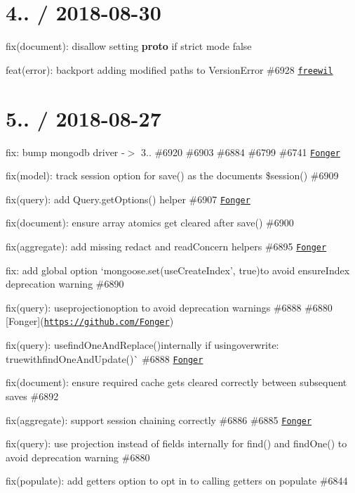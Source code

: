 \section*{4.. / 2018-\/08-\/30 }


\begin{DoxyItemize}
\item fix(document)\+: disallow setting {\bfseries proto} if strict mode false
\item feat(error)\+: backport adding modified paths to Version\+Error \#6928 \href{https://github.com/freewil}{\tt freewil}
\end{DoxyItemize}

\section*{5.. / 2018-\/08-\/27 }


\begin{DoxyItemize}
\item fix\+: bump mongodb driver -\/$>$ 3.. \#6920 \#6903 \#6884 \#6799 \#6741 \href{https://github.com/Fonger}{\tt Fonger}
\item fix(model)\+: track {\ttfamily session} option for {\ttfamily save()} as the document\textquotesingle{}s {\ttfamily \$session()} \#6909
\item fix(query)\+: add Query.\+get\+Options() helper \#6907 \href{https://github.com/Fonger}{\tt Fonger}
\item fix(document)\+: ensure array atomics get cleared after save() \#6900
\item fix(aggregate)\+: add missing redact and read\+Concern helpers \#6895 \href{https://github.com/Fonger}{\tt Fonger}
\item fix\+: add global option `mongoose.\+set(\textquotesingle{}use\+Create\+Index', true){\ttfamily to avoid ensure\+Index deprecation warning \#6890}
\item {\ttfamily fix(query)\+: use}projection{\ttfamily option to avoid deprecation warnings \#6888 \#6880 \mbox{[}Fonger\mbox{]}(\href{https://github.com/Fonger}{\tt https\+://github.\+com/\+Fonger})}
\item {\ttfamily fix(query)\+: use}find\+One\+And\+Replace(){\ttfamily internally if using}overwrite\+: true{\ttfamily with}find\+One\+And\+Update()\`{} \#6888 \href{https://github.com/Fonger}{\tt Fonger}
\item fix(document)\+: ensure required cache gets cleared correctly between subsequent saves \#6892
\item fix(aggregate)\+: support session chaining correctly \#6886 \#6885 \href{https://github.com/Fonger}{\tt Fonger}
\item fix(query)\+: use {\ttfamily projection} instead of {\ttfamily fields} internally for {\ttfamily find()} and {\ttfamily find\+One()} to avoid deprecation warning \#6880
\item fix(populate)\+: add {\ttfamily getters} option to opt in to calling getters on populate \#6844
\end{DoxyItemize}


